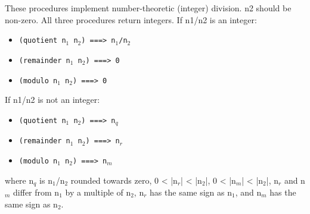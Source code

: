 \documentclass{article}
\begin{document}
These procedures implement number-theoretic (integer) division. n2 should be non-zero.
All three procedures return integers. If n1/n2 is an integer:
\begin{itemize}
\item \texttt{(quotient n$_1$ n$_2$)             ===> n$_1$/n$_2$}
\item \texttt{(remainder n$_1$ n$_2$)            ===> 0}
\item \texttt{(modulo n$_1$ n$_2$)            ===> 0}
\end{itemize}
If n1/n2 is not an integer:
\begin{itemize}
\item \texttt{(quotient n$_1$ n$_2$)             ===> n$_q$}
\item \texttt{(remainder n$_1$ n$_2$)            ===> n$_r$}
\item \texttt{(modulo n$_1$ n$_2$)               ===> n$_m$}
\end{itemize}
where n$_q$ is n$_1$/n$_2$ rounded towards zero, 0 < |n$_r$| < |n$_2$|, 0 < |n$_m$| < |n$_2$|, n$_r$ and n$_m$ differ from n$_1$ by a multiple of n$_2$, n$_r$ has the same
sign as n$_1$, and n$_m$ has the same sign as n$_2$.\\
\end{document}
